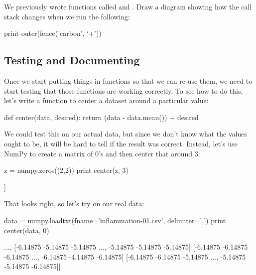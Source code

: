 \begin{challenge}
  We previously wrote functions called  and
  . Draw a diagram showing how the call stack changes when
  we run the following:
\begin{VerbIn}
print outer(fence('carbon', `+'))
\end{VerbIn}
\end{challenge}

\subsection{Testing and Documenting}

Once we start putting things in functions so that we can re-use them, we
need to start testing that those functions are working correctly. To see
how to do this, let's write a function to center a dataset around a
particular value:

\begin{VerbIn}
def center(data, desired):
    return (data - data.mean()) + desired
\end{VerbIn}

We could test this on our actual data, but since we don't know what the
values ought to be, it will be hard to tell if the result was correct.
Instead, let's use NumPy to create a matrix of 0's and then center that
around 3:

\begin{VerbIn}
z = numpy.zeros((2,2))
print center(z, 3)
\end{VerbIn}

\begin{VerbOut}
[[ 3.  3.]
 [ 3.  3.]]
\end{VerbOut}

That looks right, so let's try  on our real data:

\begin{VerbIn}
data = numpy.loadtxt(fname='inflammation-01.csv', delimiter=',')
print center(data, 0)
\end{VerbIn}

\begin{VerbOut}
[[-6.14875 -6.14875 -5.14875 ..., -3.14875 -6.14875 -6.14875]
 [-6.14875 -5.14875 -4.14875 ..., -5.14875 -6.14875 -5.14875]
 [-6.14875 -5.14875 -5.14875 ..., -4.14875 -5.14875 -5.14875]
 ...,
 [-6.14875 -5.14875 -5.14875 ..., -5.14875 -5.14875 -5.14875]
 [-6.14875 -6.14875 -6.14875 ..., -6.14875 -4.14875 -6.14875]
 [-6.14875 -6.14875 -5.14875 ..., -5.14875 -5.14875 -6.14875]]
\end{VerbOut}

